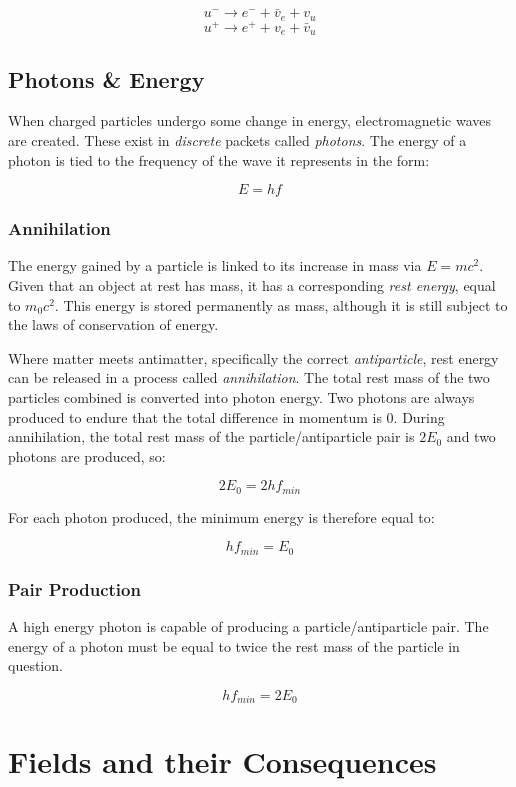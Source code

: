 \documentclass[12pt]{article}
\begin{document}
\[u^- \rightarrow e^- + \bar{v}_e + v_u\]
\[u^+ \rightarrow e^+ + v_e + \bar{v}_u\]

\subsection{Photons \& Energy}
\label{sec:org40d5745}

When charged particles undergo some change in energy, electromagnetic waves are created. These exist in \emph{discrete} packets called \emph{photons}. The energy of a photon is tied to the frequency of the wave it represents in the form:

\[E = hf\]

\subsubsection{Annihilation}
\label{sec:org16419ad}

The energy gained by a particle is linked to its increase in mass via \(E = mc^2\). Given that an object at rest has mass, it has a corresponding \emph{rest energy}, equal to \(m_0c^2\). This energy is stored permanently as mass, although it is still subject to the laws of conservation of energy.

Where matter meets antimatter, specifically the correct \emph{antiparticle}, rest energy can be released in a process called \emph{annihilation}. The total rest mass of the two particles combined is converted into photon energy. Two photons are always produced to endure that the total difference in momentum is \(0\). During annihilation, the total rest mass of the particle/antiparticle pair is \(2E_0\) and two photons are produced, so:

\[2E_0 = 2hf_{min}\]

For each photon produced, the minimum energy is therefore equal to:

\[hf_{min} = E_0\]

\subsubsection{Pair Production}
\label{sec:orgdb3af77}

A high energy photon is capable of producing a particle/antiparticle pair. The energy of a photon must be equal to twice the rest mass of the particle in question.

\[hf_{min} = 2E_0\]

\section{Fields and their Consequences}
\label{sec:org6aed283}
\end{document}
